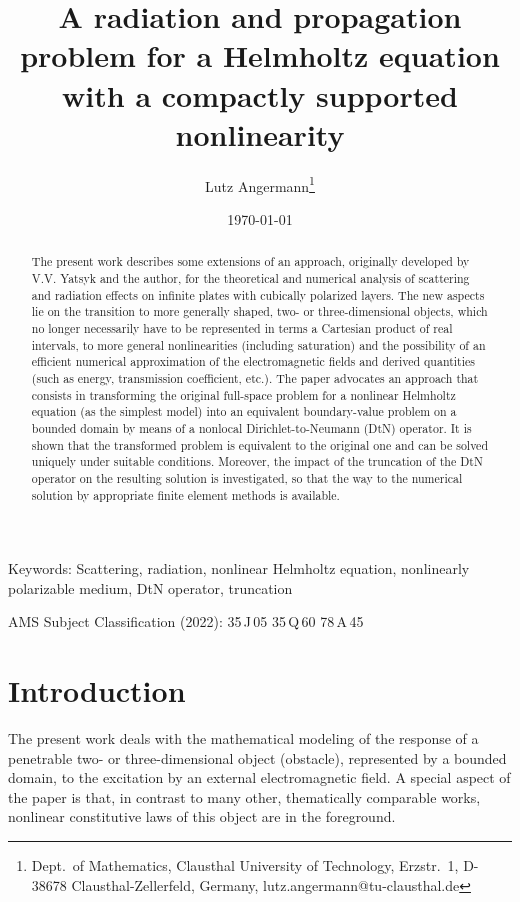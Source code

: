 \documentclass[12pt,DIV=14]{scrartcl}
\title{A radiation and propagation problem for a Helmholtz equation
with a compactly supported nonlinearity}
\author{Lutz Angermann\thanks{%
Dept.~of Mathematics, Clausthal University of Technology, Erzstr.~1, D-38678 Clausthal-Zellerfeld, Germany,
lutz.angermann@tu-clausthal.de}}
\date{\today}
\begin{document}
\maketitle

\begin{abstract}
The present work describes some extensions of an approach,
originally developed by V.V. Yatsyk and the author, for the theoretical and numerical 
analysis of scattering and radiation effects on infinite plates with cubically polarized layers.
The new aspects lie on the transition to more generally shaped,
two- or three-dimensional objects,
which no longer necessarily have to be represented in terms a Cartesian product of real intervals,
to more general nonlinearities (including saturation) and
the possibility of an efficient numerical approximation of the electromagnetic fields
and derived quantities (such as energy, transmission coefficient, etc.). 
The paper advocates an approach that consists in transforming the original full-space problem
for a nonlinear Helmholtz equation (as the simplest model)
into an equivalent boundary-value problem on a bounded domain by means
of a nonlocal Dirichlet-to-Neumann (DtN) operator.
It is shown that the transformed problem is equivalent to the original one
and can be solved uniquely under suitable conditions.
Moreover, the impact of the truncation of the DtN operator
on the resulting solution is investigated,
so that the way to the numerical solution by appropriate finite element methods is available. 
\end{abstract}

\textsf{Keywords:}
Scattering, radiation,
nonlinear Helmholtz equation,
nonlinearly polarizable medium,
DtN operator,
truncation

\bigskip
\textsf{AMS Subject Classification (2022):}
35\,J\,05 %
35\,Q\,60 %
78\,A\,45 %

\section{Introduction}
The present work deals with the mathematical modeling of the response of
a penetrable two- or three-dimensional object (obstacle), represented by a bounded domain,
to the excitation  by an external electromagnetic field.
A special aspect of the paper is that, in contrast to many other, thematically comparable works,
nonlinear constitutive laws of this object are in the foreground.
\end{document}
